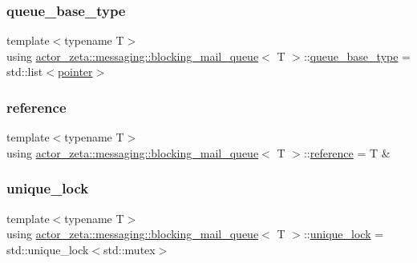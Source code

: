 \subsubsection{\texorpdfstring{queue\+\_\+base\+\_\+type}{queue\_base\_type}}
{\footnotesize\ttfamily template$<$typename T$>$ \\
using \hyperlink{classactor__zeta_1_1messaging_1_1blocking__mail__queue}{actor\+\_\+zeta\+::messaging\+::blocking\+\_\+mail\+\_\+queue}$<$ T $>$\+::\hyperlink{classactor__zeta_1_1messaging_1_1blocking__mail__queue_a3d270721dd7c3e166e39578cc6b761ce}{queue\+\_\+base\+\_\+type} =  std\+::list$<$\hyperlink{classactor__zeta_1_1messaging_1_1blocking__mail__queue_a64432628c6a91d330431fc3299021045}{pointer}$>$}

\mbox{\label{classactor__zeta_1_1messaging_1_1blocking__mail__queue_a838522d611616b1bd7c46da5fe6895fb}} 
\subsubsection{\texorpdfstring{reference}{reference}}
{\footnotesize\ttfamily template$<$typename T$>$ \\
using \hyperlink{classactor__zeta_1_1messaging_1_1blocking__mail__queue}{actor\+\_\+zeta\+::messaging\+::blocking\+\_\+mail\+\_\+queue}$<$ T $>$\+::\hyperlink{classactor__zeta_1_1messaging_1_1blocking__mail__queue_a838522d611616b1bd7c46da5fe6895fb}{reference} =  T \&}

\mbox{\label{classactor__zeta_1_1messaging_1_1blocking__mail__queue_a61d0417725665aba520dc0a51f1ec37a}} 
\subsubsection{\texorpdfstring{unique\+\_\+lock}{unique\_lock}}
{\footnotesize\ttfamily template$<$typename T$>$ \\
using \hyperlink{classactor__zeta_1_1messaging_1_1blocking__mail__queue}{actor\+\_\+zeta\+::messaging\+::blocking\+\_\+mail\+\_\+queue}$<$ T $>$\+::\hyperlink{classactor__zeta_1_1messaging_1_1blocking__mail__queue_a61d0417725665aba520dc0a51f1ec37a}{unique\+\_\+lock} =  std\+::unique\+\_\+lock$<$std\+::mutex$>$}



